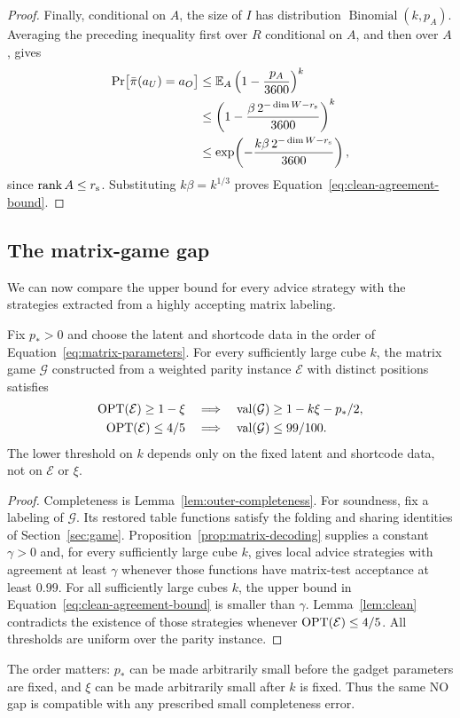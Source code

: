 \begin{proof}
Finally, conditional on $A$, the size of $I$ has distribution
$\operatorname{Binomial}(k,p_A)$.  Averaging the preceding inequality
first over $R$ conditional on $A$, and then over $A$, gives
\begin{align*}
 \Pr\bigl[\bar\pi(a_U)=a_O\bigr]
 &\le \mathbb E_A\left(1-\frac{p_A}{3600}\right)^k\\
 &\le\left(1-\frac{\beta\,2^{-\dim W-r_{\rm s}}}{3600}\right)^k\\
 &\le \exp\!\left(
 -\frac{k\beta\,2^{-\dim W-r_{\rm s}}}{3600}
 \right),
\end{align*}
since $\operatorname{rank} A\le r_{\rm s}$.  Substituting
$k\beta=k^{1/3}$ proves Equation~\eqref{eq:clean-agreement-bound}.
\end{proof}

\subsection{The matrix-game gap}

We can now compare the upper bound for every advice strategy with the
strategies extracted from a highly accepting matrix labeling.

\begin{proposition}
\label{prop:matrix-gap}
Fix $p_*>0$ and choose the latent and shortcode data in the order of
Equation~\eqref{eq:matrix-parameters}.  For every sufficiently large
cube $k$, the matrix game $\mathcal G$ constructed from a weighted
parity instance $\mathcal E$ with distinct positions satisfies
\[
 \begin{aligned}
 \operatorname{OPT}(\mathcal E)\ge1-\xi
 &\quad\Longrightarrow\quad
 \operatorname{val}(\mathcal G)\ge1-k\xi-p_*/2,\\
 \operatorname{OPT}(\mathcal E)\le4/5
 &\quad\Longrightarrow\quad
 \operatorname{val}(\mathcal G)\le99/100.
 \end{aligned}
\]
The lower threshold on $k$ depends only on the fixed latent and
shortcode data, not on $\mathcal E$ or $\xi$.
\end{proposition}

\begin{proof}
Completeness is Lemma~\ref{lem:outer-completeness}.  For soundness,
fix a labeling of $\mathcal G$.  Its restored table functions satisfy
the folding and sharing identities of Section~\ref{sec:game}.
Proposition~\ref{prop:matrix-decoding} supplies a constant $\gamma>0$
and, for every sufficiently large cube $k$, gives local advice
strategies with agreement at least $\gamma$ whenever those functions
have matrix-test acceptance at least $0.99$.  For all sufficiently large
cubes $k$, the upper
bound in Equation~\eqref{eq:clean-agreement-bound} is smaller than
$\gamma$.
Lemma~\ref{lem:clean} contradicts the existence of those strategies
whenever $\operatorname{OPT}(\mathcal E)\le4/5$.  All thresholds are uniform over
the parity instance.
\end{proof}

The order matters: $p_*$ can be made arbitrarily small before the
gadget parameters are fixed, and $\xi$ can be made arbitrarily small
after $k$ is fixed.  Thus the same NO gap is compatible with any
prescribed small completeness error.

